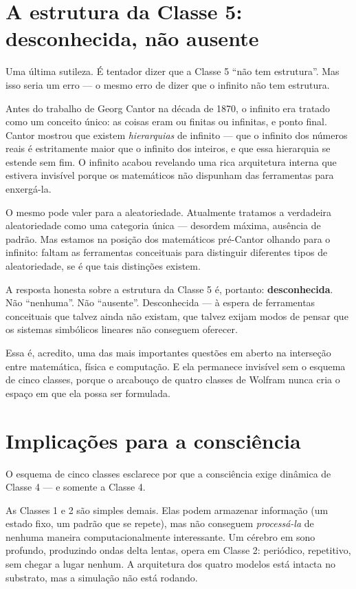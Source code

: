 \documentclass[11pt, twoside, openright]{book}
\begin{document}
\section*{A estrutura da Classe 5: desconhecida, não ausente}

Uma última sutileza. É tentador dizer que a Classe 5 ``não tem estrutura''. Mas isso seria um erro --- o mesmo erro de dizer que o infinito não tem estrutura.

Antes do trabalho de Georg Cantor na década de 1870, o infinito era tratado como um conceito único: as coisas eram ou finitas ou infinitas, e ponto final. Cantor mostrou que existem \textit{hierarquias} de infinito --- que o infinito dos números reais é estritamente maior que o infinito dos inteiros, e que essa hierarquia se estende sem fim. O infinito acabou revelando uma rica arquitetura interna que estivera invisível porque os matemáticos não dispunham das ferramentas para enxergá-la.

O mesmo pode valer para a aleatoriedade. Atualmente tratamos a verdadeira aleatoriedade como uma categoria única --- desordem máxima, ausência de padrão. Mas estamos na posição dos matemáticos pré-Cantor olhando para o infinito: faltam as ferramentas conceituais para distinguir diferentes tipos de aleatoriedade, se é que tais distinções existem.

A resposta honesta sobre a estrutura da Classe 5 é, portanto: \textbf{desconhecida}. Não ``nenhuma''. Não ``ausente''. Desconhecida --- à espera de ferramentas conceituais que talvez ainda não existam, que talvez exijam modos de pensar que os sistemas simbólicos lineares não conseguem oferecer.

Essa é, acredito, uma das mais importantes questões em aberto na interseção entre matemática, física e computação. E ela permanece invisível sem o esquema de cinco classes, porque o arcabouço de quatro classes de Wolfram nunca cria o espaço em que ela possa ser formulada.

\section*{Implicações para a consciência}

O esquema de cinco classes esclarece por que a consciência exige dinâmica de Classe 4 --- e somente a Classe 4.

As Classes 1 e 2 são simples demais. Elas podem armazenar informação (um estado fixo, um padrão que se repete), mas não conseguem \textit{processá-la} de nenhuma maneira computacionalmente interessante. Um cérebro em sono profundo, produzindo ondas delta lentas, opera em Classe 2: periódico, repetitivo, sem chegar a lugar nenhum. A arquitetura dos quatro modelos está intacta no substrato, mas a simulação não está rodando.
\end{document}
